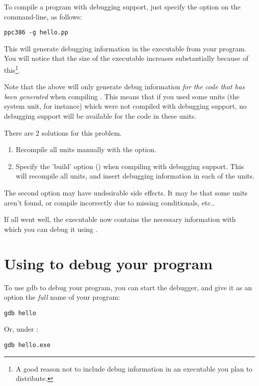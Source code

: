 \documentclass{report}
\begin{document}
To compile a program with debugging support, just specify the 
option on the command-line, as follows:
\begin{verbatim}
ppc386 -g hello.pp
\end{verbatim}
This will generate debugging information in the executable from your
program. You will notice that the size of the executable increases
substantially because of this\footnote{A good reason not to include debug
information in an executable you plan to distribute.}.

Note that the above will only generate debug information {\em for the code
that has been generated} when compiling . This means that if
you used some units (the system unit, for instance) which were not compiled
with debugging support, no debugging support will be available for the code
in these units.

There are 2 solutions for this problem.
\begin{enumerate}
\item Recompile all units manually with the  option.
\item Specify the 'build' option () when compiling with debugging
support. This will recompile all units, and insert debugging information in
each of the units.
\end{enumerate}
The second option may have undesirable side effects. It may be that some
units aren't found, or compile incorrectly due to missing conditionals,
etc..

If all went well, the executable now contains the necessary information with
which you can debug it using \gnu {}.


\section{Using  to debug your program}

To use gdb to debug your program, you can start the debugger, and give it as
an option the {\em full} name of your program:
\begin{verbatim}
gdb hello
\end{verbatim}
Or, under \dos :
\begin{verbatim}
gdb hello.exe
\end{verbatim}
\end{document}
